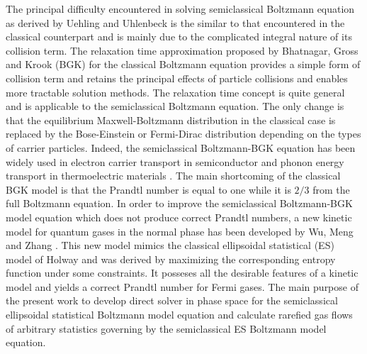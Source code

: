 \documentclass{rsproca}%
\begin{document}
The principal difficulty encountered in solving semiclassical Boltzmann equation as derived by Uehling and Uhlenbeck is the similar to that encountered in the classical counterpart and is mainly due to the complicated integral nature of its collision term. The relaxation time approximation proposed by Bhatnagar, Gross and Krook (BGK) \cite{PhysRev.94.511} for the classical Boltzmann equation provides a simple form of collision term and retains the principal effects of particle collisions and enables more tractable solution methods.  The relaxation time concept is quite general and is applicable to the semiclassical Boltzmann equation.   The only change is that the equilibrium Maxwell-Boltzmann distribution in the classical case is replaced by the Bose-Einstein or Fermi-Dirac distribution depending on the types of carrier particles.  Indeed, the semiclassical Boltzmann-BGK equation has been widely used in electron carrier transport in semiconductor \cite{Lundstrom:2000,Fatemi1993209,Carrillo2003498,Majorana2001649,Carrillo2003JCEL,Carrillo2003b,Markowich2002,Pattamatta2009,Scaldaferri2007} and phonon energy transport in thermoelectric materials \cite{mit2005nanoscale}.   The main shortcoming of the classical BGK model is that the Prandtl number is equal to one while it is $2/3$ from the full Boltzmann equation.  In order to improve the semiclassical Boltzmann-BGK model equation which does not produce correct Prandtl numbers, a new kinetic model for quantum gases in the normal phase has been developed by Wu, Meng and Zhang \cite{Wu2012}. This new model mimics the classical ellipsoidal statistical (ES) model of Holway \cite{Holway1658} and was derived by maximizing the corresponding entropy function under some constraints.   It posseses all the desirable features of a kinetic model and yields a correct Prandtl number for Fermi gases.   The main purpose of the present work to develop direct solver in phase space for the semiclassical ellipsoidal statistical Boltzmann model equation and calculate rarefied gas flows of arbitrary statistics governing by the semiclassical ES Boltzmann model equation.
\end{document}
